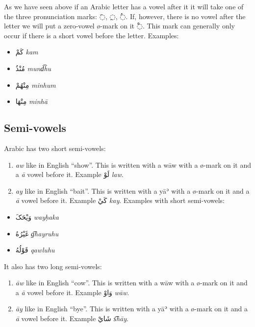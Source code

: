 \documentclass[
  10pt,
]{book}
\providecommand{\tightlist}{%
  \setlength{\itemsep}{0pt}\setlength{\parskip}{0pt}}
\begin{document}
As we have seen above if an Arabic letter has a vowel after it it will take one of the three pronunciation marks: \foreignlanguage{arabic}{◌َ}, \foreignlanguage{arabic}{◌ِ}, \foreignlanguage{arabic}{◌ُ}. If, however, there is no vowel after the letter we will put a zero-vowel ø-mark on it \foreignlanguage{arabic}{◌ْ}. This mark can generally only occur if there is a short vowel before the letter. Examples:

\begin{itemize}
\tightlist
\item
  \foreignlanguage{arabic}{کَمْ} \emph{kam}
\item
  \foreignlanguage{arabic}{مُنْذُ} \emph{mund͡hu}
\item
  \foreignlanguage{arabic}{مِنْهُمْ} \emph{minhum}
\item
  \foreignlanguage{arabic}{مِنْهَا} \emph{minhā}
\end{itemize}

\subsection{Semi-vowels}\label{semi-vowels}

Arabic has two short semi-vowels:

\begin{enumerate}
\def\labelenumi{\arabic{enumi}.}
\tightlist
\item
  \emph{aw} like in English \enquote{show}. This is written with a wāw with a ø-mark on it and a \emph{ā} vowel before it. Example \foreignlanguage{arabic}{لَوْ} \emph{law}.
\item
  \emph{ay} like in English \enquote{bait}. This is written with a yāʾ with a ø-mark on it and a \emph{ā} vowel before it. Example \foreignlanguage{arabic}{کَيْ} \emph{kay}.
  Examples with short semi-vowels:
\end{enumerate}

\begin{itemize}
\tightlist
\item
  \foreignlanguage{arabic}{وَيْحَکَ} \emph{wayḥaka}
\item
  \foreignlanguage{arabic}{غَيْرُهُ} \emph{g͡hayruhu}
\item
  \foreignlanguage{arabic}{قَوْلُهُ} \emph{qawluhu}
\end{itemize}

It also has two long semi-vowels:

\begin{enumerate}
\def\labelenumi{\arabic{enumi}.}
\tightlist
\item
  \emph{āw} like in English \enquote{cow}. This is written with a wāw with a ø-mark on it and a \emph{ā} vowel before it. Example \foreignlanguage{arabic}{وَاوْ} \emph{wāw}.
\item
  \emph{āy} like in English \enquote{bye}. This is written with a yāʾ with a ø-mark on it and a \emph{ā} vowel before it. Example \foreignlanguage{arabic}{شَايْ} \emph{s͡hāy}.
\end{enumerate}
\end{document}
